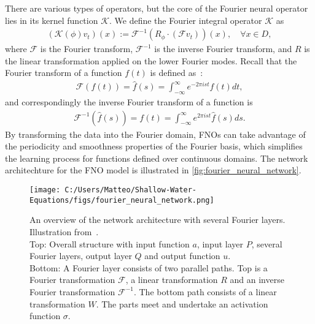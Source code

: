 There are various types of operators, but the core of the Fourier neural operator lies in its kernel function $\mathcal{K}$.
We define the Fourier integral operator $\mathcal{K}$ as 
\begin{align}
    \left( \mathcal{K}(\phi)v_t \right) (x) := \mathcal{F}^{-1} \left( R_{\phi} \cdot (\mathcal{F}v_t ) \right)(x), \quad \forall x \in D,
\end{align}
where $\mathcal{F}$ is the Fourier transform, $\mathcal{F}^{-1}$ is the inverse Fourier transform, and $R$ is the linear transformation applied on the lower Fourier modes. 
Recall that the Fourier transform of a function $f(t)$ is defined as~\cite{Fourier_Transform}:
\begin{align}
    \mathcal{F} (f(t)) = \hat{f}(s) = \int_{-\infty}^{\infty} e^{ -2 \pi ist} f(t) dt,
\end{align}
and correspondingly the inverse Fourier transform of a function is
\begin{align*}
    \mathcal{F}^{-1} (\hat{f}(s)) = f(t) = \int_{-\infty}^{\infty}  e^{2 \pi ist} \hat{f}(s) ds.
\end{align*}
By transforming the data into the Fourier domain, FNOs can take advantage of the periodicity and smoothness properties of the Fourier basis, which simplifies the learning process for functions defined over continuous domains.
The network architechture for the FNO model is illustrated in \autoref{fig:fourier_neural_network}.
\begin{figure}[H]
    \centering
    \texttt{[image: C:/Users/Matteo/Shallow-Water-Equations/figs/fourier\_neural\_network.png]}
    \caption{An overview of the network architecture with several Fourier layers. Illustration from~\cite{FNO_2021}.\\
            Top: Overall structure with input function $a$, input layer $P$, several Fourier layers, output layer $Q$ and output function $u$.\\
            Bottom: A Fourier layer consists of two parallel paths. Top is a Fourier transformation $\mathcal{F}$, a linear transformation $R$ and an inverse Fourier transformation $\mathcal{F}^{-1}$.
            The bottom path consists of a linear transformation $W$. The parts meet and undertake an activation function $\sigma$.}\label{fig:fourier_neural_network}
\end{figure}
